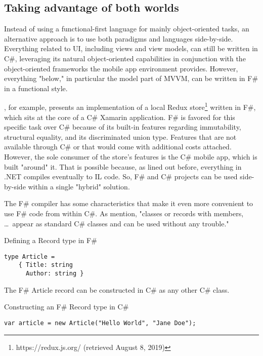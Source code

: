 \subsection{Taking advantage of both worlds}

Instead of using a functional-first language for mainly object-oriented tasks, an alternative approach is to use both paradigms and languages side-by-side. Everything related to UI, including views and view models, can still be written in C\#, leveraging its natural object-oriented capabilities in conjunction with the object-oriented frameworks the mobile app environment provides. However, everything "below," in particular the model part of MVVM, can be written in F\# in a functional style.

\cite{bandt_building_2018}, for example, presents an implementation of a local Redux store\footnote{https://redux.js.org/ (retrieved August 8, 2019)} written in F\#, which sits at the core of a C\# Xamarin application. F\# is favored for this specific task over C\# because of its built-in features regarding immutability, structural equality, and its discriminated union type. Features that are not available through C\# or that would come with additional costs attached. However, the sole consumer of the store's features is the C\# mobile app, which is built "around" it. That is possible because, as lined out before, everything in .NET compiles eventually to IL code. So, F\# and C\# projects can be used side-by-side within a single "hybrid" solution.

The F\# compiler has some characteristics that make it even more convenient to use F\# code from within C\#. As \cite[255]{petricek_real_2009} mention, "classes or records with members, \dots\ appear as standard C\# classes and can be used without any trouble."

\begin{listing}[H]
\caption{Defining a Record type in F\#}
\begin{verbatim}
type Article =
    { Title: string
      Author: string }
\end{verbatim}
\end{listing}

The F\# Article record can be constructed in C\# as any other C\# class.

\begin{listing}[H]
\caption{Constructing an F\# Record type in C\#}
\begin{verbatim}
var article = new Article("Hello World", "Jane Doe");
\end{verbatim}
\end{listing}

